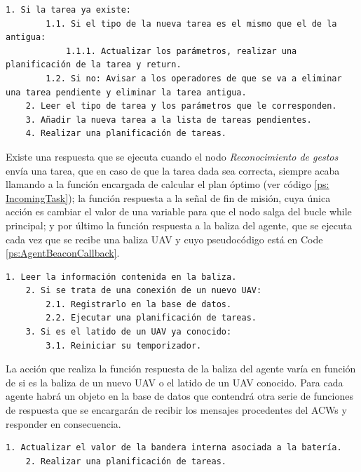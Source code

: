 \documentclass[fontsize=11pt, English=false, Español=true, Myfinal=true, twoside, numbers=noenddot]{scrbook}
\begin{document}
\begin{lstlisting}[caption={Pseudocódico de la respuesta a nueva tarea}, breaklines=true, label=ps:IncomingTask]
	1. Si la tarea ya existe:
		1.1. Si el tipo de la nueva tarea es el mismo que el de la antigua:
			1.1.1. Actualizar los parámetros, realizar una planificación de la tarea y return.
		1.2. Si no: Avisar a los operadores de que se va a eliminar una tarea pendiente y eliminar la tarea antigua.
	2. Leer el tipo de tarea y los parámetros que le corresponden.
	3. Añadir la nueva tarea a la lista de tareas pendientes.
	4. Realizar una planificación de tareas.
\end{lstlisting}

Existe una respuesta que se ejecuta cuando el nodo \emph{Reconocimiento de gestos} envía una tarea, que en caso de que la tarea dada sea correcta, siempre acaba llamando a la función encargada de calcular el plan óptimo (ver código \ref{ps: IncomingTask}); la función respuesta a la señal de fin de misión, cuya única acción es cambiar el valor de una variable para que el nodo salga del bucle while principal; y por último la función respuesta a la baliza del agente, que se ejecuta cada vez que se recibe una baliza \gls{UAV} y cuyo pseudocódigo está en Code \ref{ps:AgentBeaconCallback}.

\begin{lstlisting}[caption={Pseudocódigo de la función respuesta a la baliza del agente}, breaklines=true, label=ps:AgentBeaconCallback]
	1. Leer la información contenida en la baliza.
	2. Si se trata de una conexión de un nuevo UAV:
		2.1. Registrarlo en la base de datos.
		2.2. Ejecutar una planificación de tareas.
	3. Si es el latido de un UAV ya conocido:
		3.1. Reiniciar su temporizador.
\end{lstlisting}

La acción que realiza la función respuesta de la baliza del agente varía en función de si es la baliza de un nuevo \gls{UAV} o el latido de un \gls{UAV} conocido. Para cada agente habrá un objeto en la base de datos que contendrá otra serie de funciones de respuesta que se encargarán de recibir los mensajes procedentes del \glspl{ACW} y responder en consecuencia.

\begin{lstlisting}[caption={Funcion de respuesta que se ejecuta cuando un \emph{Gestor de comportamiento} de agente envía información sobre la batería}, breaklines=true, label=ps:batteryEnoughCB]
	1. Actualizar el valor de la bandera interna asociada a la batería.
	2. Realizar una planificación de tareas.
\end{lstlisting}
\end{document}
